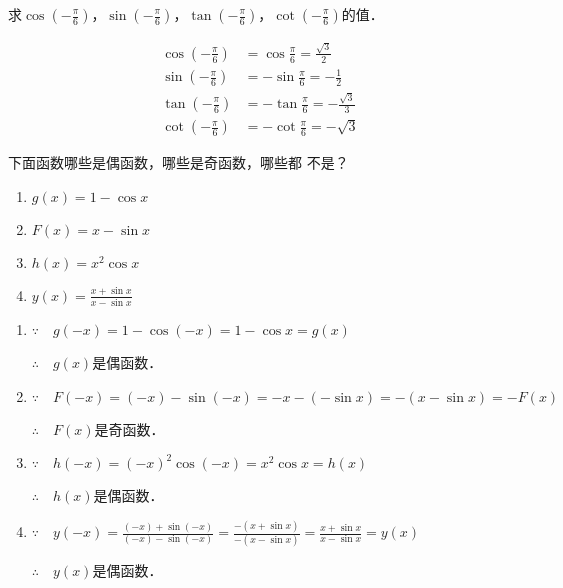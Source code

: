 \begin{example}
求$\cos\left(-\frac{\pi}{6}\right)$，$\sin \left(-\frac{\pi}{6}\right)$，$\tan\left(-\frac{\pi}{6}\right)$，$\cot\left(-\frac{\pi}{6}\right)$的值．    
\end{example}

\begin{solution}
\[\begin{split}
\cos\left(-\frac{\pi}{6}\right)&=\cos\frac{\pi}{6}=\frac{\sqrt{3}}{2}  \\
\sin\left(-\frac{\pi}{6}\right)&=-\sin\frac{\pi}{6}=-\frac{1}{2} \\
\tan\left(-\frac{\pi}{6}\right)&=-\tan\frac{\pi}{6}=-\frac{\sqrt{3}}{3}   \\
\cot\left(-\frac{\pi}{6}\right)&=-\cot\frac{\pi}{6}=-\sqrt{3}
\end{split}\]
\end{solution}

\begin{example}
    下面函数哪些是偶函数，哪些是奇函数，哪些都
不是？
\begin{multicols}{2}
\begin{enumerate}
    \item $g(x)=1-\cos x$
    \item $F(x)=x-\sin x$
    \item $h(x)=x^2\cos x$
    \item $y(x)=\frac{x+\sin x}{x-\sin x}$
\end{enumerate}
\end{multicols}
\end{example}

\begin{solution}
\begin{enumerate}
    \item $\because\quad g(-x)=1-\cos(-x)=1-\cos x=g(x)$
    
    $\therefore\quad g(x)$是偶函数．
    \item $\because\quad F(-x)=(-x)-\sin(-x)=-x-(-\sin x)=-(x-\sin x)=-F(x)$
    
    $\therefore\quad F(x)$是奇函数．
    \item $\because\quad h(-x)=(-x)^2\cos(-x)=x^2\cos x=h(x)$
    
    $\therefore\quad h(x)$是偶函数．
    \item $\because\quad y(-x)=\frac{(-x)+\sin (-x)}{(-x)-\sin (-x)}=\frac{-(x+\sin x)}{-(x-\sin x)}=\frac{x+\sin x}{x-\sin x}=y(x)$
    
    $\therefore\quad y(x)$是偶函数．
\end{enumerate}
\end{solution}

